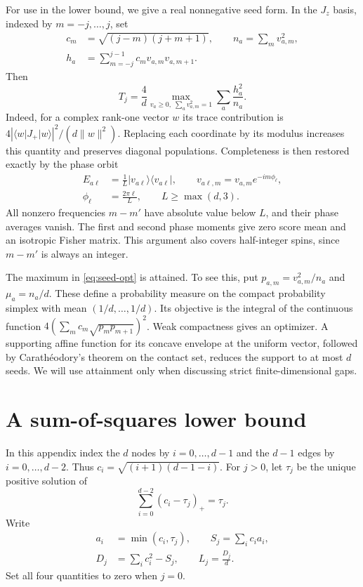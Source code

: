 \documentclass[aps,pra,reprint,superscriptaddress]{revtex4-2}
\theoremstyle{remark}
\newcommand{\norm}[1]{\lVert#1\rVert}
\newcommand{\ket}[1]{\lvert#1\rangle}
\newcommand{\bra}[1]{\langle#1\rvert}
\begin{document}
For use in the lower bound, we give a real nonnegative seed form. In
the $J_z$ basis, indexed by $m=-j,\ldots,j$, set
\begin{equation}
\begin{aligned}
c_m&=\sqrt{(j-m)(j+m+1)},\qquad
n_a=\sum_m v_{a,m}^2,\\
h_a&=\sum_{m=-j}^{j-1}c_mv_{a,m}v_{a,m+1}.
\end{aligned}
\label{eq:seeds}
\end{equation}
Then
\begin{equation}
 T_j=\frac4d\max_{v_a\geq0,\;\sum_a v_{a,m}^2=1}
 \sum_a\frac{h_a^2}{n_a}.
 \label{eq:seed-opt}
\end{equation}
Indeed, for a complex rank-one vector $w$ its trace contribution is
$4|\bra wJ_+\ket w|^2/(d\norm w^2)$. Replacing each coordinate by
its modulus increases this quantity and preserves diagonal
populations. Completeness is then restored exactly by the phase
orbit
\begin{equation}
\begin{aligned}
E_{a\ell}&=\frac1L\ket{v_{a\ell}}\bra{v_{a\ell}},\qquad
v_{a\ell,m}=v_{a,m}e^{-im\phi_\ell},\\
\phi_\ell&=\frac{2\pi\ell}{L},\qquad L\geq\max(d,3).
\end{aligned}
\label{eq:phase-orbit}
\end{equation}
All nonzero frequencies $m-m'$ have absolute value below $L$, and
their phase averages vanish. The first and second phase moments give
zero score mean and an isotropic Fisher matrix. This argument also
covers half-integer spins, since $m-m'$ is always an integer.

The maximum in \eqref{eq:seed-opt} is attained. To see this, put
$p_{a,m}=v_{a,m}^2/n_a$ and $\mu_a=n_a/d$. These define a probability
measure on the compact probability simplex with mean
$(1/d,\ldots,1/d)$. Its objective is the integral of the continuous
function $4(\sum_mc_m\sqrt{p_mp_{m+1}})^2$. Weak compactness gives
an optimizer. A supporting affine function for its concave envelope
at the uniform vector, followed by Carath\'eodory's theorem on the
contact set, reduces the support to at most $d$ seeds. We will use
attainment only when discussing strict finite-dimensional gaps.


\section{A sum-of-squares lower bound}\label{sec:lower}
In this appendix index the $d$ nodes by $i=0,\ldots,d-1$ and the
$d-1$ edges by $i=0,\ldots,d-2$. Thus
$c_i=\sqrt{(i+1)(d-1-i)}$. For $j>0$, let $\tau_j$ be the unique
positive solution of
\begin{equation}
 \sum_{i=0}^{d-2}(c_i-\tau_j)_+=\tau_j.
 \label{eq:cap}
\end{equation}
Write
\begin{equation}
\begin{aligned}
a_i&=\min(c_i,\tau_j),\qquad S_j=\sum_i c_i a_i,\\
D_j&=\sum_i c_i^2-S_j,\qquad L_j=\frac{D_j}{d}.
\end{aligned}
\label{eq:cap-quantities}
\end{equation}
Set all four quantities to zero when $j=0$.
\end{document}
